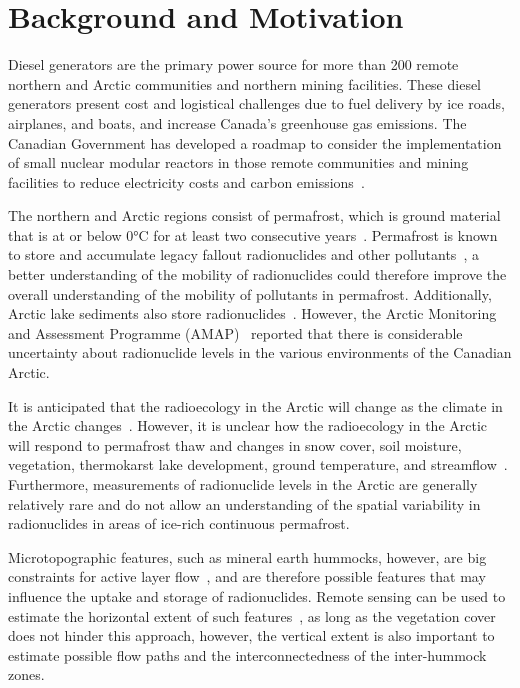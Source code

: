 \chapter{Background and Motivation}
Diesel generators are the primary power source for more than 200 remote northern and Arctic communities and northern mining facilities. 
These diesel generators present cost and logistical challenges due to fuel delivery by ice roads, airplanes, and boats, and increase Canada's greenhouse gas emissions. 
The Canadian Government has developed a roadmap to consider the implementation of small nuclear modular reactors in those remote communities and mining facilities to 
reduce electricity costs and carbon emissions~\citep{canadiansmallmodularreactorroadmapsteeringcommitteeCallActionCanadian2018}.

The northern and Arctic regions consist of permafrost, which is ground material that is at or below 0°C for at least two consecutive years~\citep{lewkowiczIllustratedPermafrostDictionary2024}. 
Permafrost is known to store and accumulate legacy fallout radionuclides and other pollutants~\citep{bondPermafrostThawImplications2018, olsonMercuryCyclingNorthern2018}, 
a better understanding of the mobility of radionuclides could therefore improve the overall understanding of the mobility of pollutants in permafrost. 
Additionally, Arctic lake sediments also store radionuclides~\citep{marshLakeSedimentationMackenzie1999}. 
However, the Arctic Monitoring and Assessment Programme (AMAP)~\citep{arcticmonitoringandassessmentprogrammeamapAMAPAssessment20152015} reported that there is considerable uncertainty about radionuclide levels in the various environments of the Canadian Arctic.

It is anticipated that the radioecology in the Arctic will change as the climate in the Arctic changes~\citep{arcticmonitoringandassessmentprogrammeamapAMAPAssessment20152015, bondPermafrostThawImplications2018}. 
However, it is unclear how the radioecology in the Arctic will respond to permafrost thaw and changes in snow cover, soil moisture, vegetation, thermokarst lake development, ground temperature, and streamflow~\citep{overlandIntegratedIndexRecent2019}. 
Furthermore, measurements of radionuclide levels in the Arctic are generally relatively rare and do not allow an understanding of the spatial variability in radionuclides in areas of ice-rich continuous permafrost.

Microtopographic features, such as mineral earth hummocks, however, are big constraints for active layer flow~\citep{quintonSubsurfaceDrainageHummockcovered2000}, and are therefore possible features that may influence the uptake and storage of radionuclides. 
Remote sensing can be used to estimate the horizontal extent of such features~\citep{dakinHowDryYear2023}, as long as the vegetation cover does not hinder this approach, however, the vertical extent is also important to estimate possible flow paths and the interconnectedness of the inter-hummock zones.

